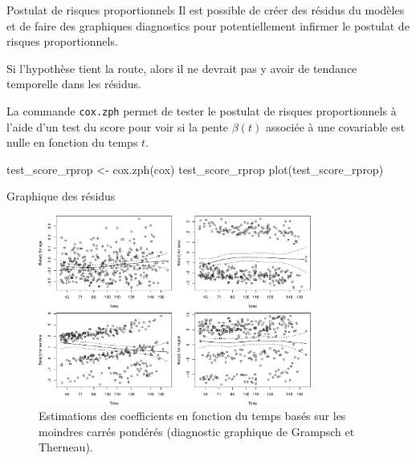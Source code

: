 \documentclass[
  ignorenonframetext,
]{beamer}
\newenvironment{Shaded}{\begin{snugshade}}{\end{snugshade}}
\newcommand{\FunctionTok}[1]{\textcolor[rgb]{0.28,0.35,0.67}{#1}}
\newcommand{\NormalTok}[1]{\textcolor[rgb]{0.00,0.23,0.31}{#1}}
\newcommand{\OtherTok}[1]{\textcolor[rgb]{0.00,0.23,0.31}{#1}}
\begin{document}
\begin{frame}[fragile]{Postulat de risques proportionnels}
\protect\hypertarget{postulat-de-risques-proportionnels}{}
Il est possible de créer des résidus du modèles et de faire des
graphiques diagnostics pour potentiellement infirmer le postulat de
risques proportionnels.

Si l'hypothèse tient la route, alors il ne devrait pas y avoir de
tendance temporelle dans les résidus.

La commande \texttt{cox.zph} permet de tester le postulat de risques
proportionnels à l'aide d'un test du score pour voir si la pente
\(\beta(t)\) associée à une covariable est nulle en fonction du temps
\(t\).

\begin{Shaded}
\begin{Highlighting}[numbers=left,,]
\NormalTok{test\_score\_rprop }\OtherTok{\textless{}{-}} \FunctionTok{cox.zph}\NormalTok{(cox)}
\NormalTok{test\_score\_rprop}
\FunctionTok{plot}\NormalTok{(test\_score\_rprop)}
\end{Highlighting}
\end{Shaded}
\end{frame}

\begin{frame}{Graphique des résidus}
\protect\hypertarget{graphique-des-ruxe9sidus}{}
\begin{figure}

{\centering \includegraphics[width=0.8\textwidth,height=\textheight]{MATH60602-diapos9_files/figure-beamer/fig-coxph-hypothese-1.pdf}

}

\caption{\label{fig-coxph-hypothese}Estimations des coefficients en
fonction du temps basés sur les moindres carrés pondérés (diagnostic
graphique de Grampsch et Therneau).}

\end{figure}
\end{frame}
\end{document}
